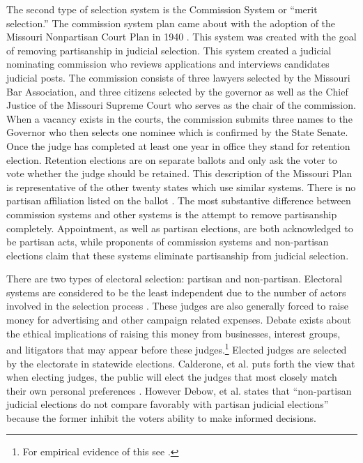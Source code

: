 \documentclass[12pt]{article}
\begin{document}
The second type of selection system is the Commission System or “merit selection.” The commission system plan came about with the adoption of the Missouri Nonpartisan Court Plan in 1940 \citep{Watson1969}. This system was created with the goal of removing partisanship in judicial selection. This system created a judicial nominating commission who reviews applications and interviews candidates judicial posts. The commission consists of three lawyers selected by the Missouri Bar Association, and three citizens selected by the governor as well as the Chief Justice of the Missouri Supreme Court who serves as the chair of the commission. When a vacancy exists in the courts, the commission submits three names to the Governor who then selects one nominee which is confirmed by the State Senate. Once the judge has completed at least one year in office they stand for retention election. Retention elections are on separate ballots and only ask the voter to vote whether the judge should be retained. This description of the Missouri Plan is representative of the other twenty states which use similar systems.  There is no partisan affiliation listed on the ballot \citep{Watson1969}.  The most substantive difference between commission systems and other systems is the attempt to remove partisanship completely. Appointment, as well as partisan elections, are both acknowledged to be partisan acts, while proponents of commission systems and non-partisan elections claim that these systems eliminate partisanship from judicial selection. 

There are two types of electoral selection: partisan and non-partisan.  Electoral systems are considered to be the least independent due to the number of actors involved in the selection process \citep{Choi2010}. These judges are also generally forced to raise money for advertising and other campaign related expenses.  Debate exists about the ethical implications of raising this money from businesses, interest groups, and litigators that may appear before these judges.\footnote{For empirical evidence of this see \citep{Gibson2008}.}  Elected judges are selected by the electorate in statewide elections.  Calderone, et al. puts forth the view that when electing judges, the public will elect the judges that most closely match their own personal preferences \citep{Caldarone2009}.  However Debow, et al. \citeyearpar{Debow2013} states that ``non-partisan judicial elections do not compare favorably with partisan judicial elections'' because the former inhibit the voters ability to make informed decisions.
\end{document}
